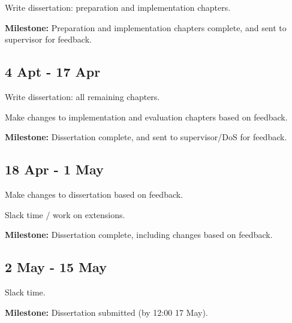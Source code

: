 Write dissertation: preparation and implementation chapters.

\textbf{Milestone:} Preparation and implementation chapters complete, and sent to supervisor for feedback.


\subsection*{4 Apt - 17 Apr}

Write dissertation: all remaining chapters.

Make changes to implementation and evaluation chapters based on feedback.

\textbf{Milestone:} Dissertation complete, and sent to supervisor/DoS for feedback.


\subsection*{18 Apr - 1 May}

Make changes to dissertation based on feedback.

Slack time / work on extensions.

\textbf{Milestone:} Dissertation complete, including changes based on feedback.


\subsection*{2 May - 15 May}

Slack time.

\textbf{Milestone:} Dissertation submitted (by 12:00 17 May).


